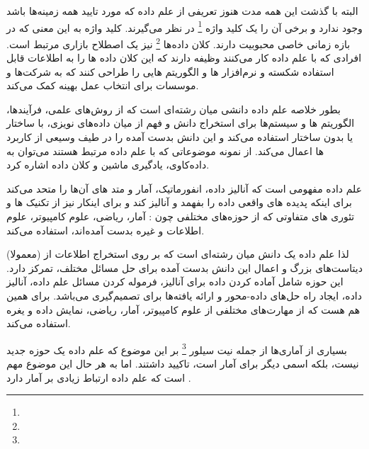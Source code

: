\documentclass[a4paper, 12pt]{article}
\begin{document}
البته با گذشت این همه مدت هنوز تعریفی از علم داده که مورد تایید همه زمینه‌ها باشد وجود ندارد و برخی آن‌ را یک کلید واژه
\footnote{}
 در نظر می‌گیرند. 
 کلید واژه به این معنی که در بازه زمانی خاصی محبوبیت دارند. 
 کلان داده‌ها 
 \footnote{}
 نیز یک اصطلاح بازاری مرتبط است. افرادی که با علم داده کار می‌کنند وظیفه دارند که این کلان داده ها را به اطلاعات قابل استفاده شکسته و نرم‌افزار ها و الگوریتم هایی را طراحی کنند که به شرکت‌ها و موسسات برای انتخاب عمل بهینه کمک می‌کند. 
 
 بطور خلاصه علم داده دانشی میان رشته‌ای است که از روش‌های علمی، فرآیند‌ها، الگوریتم ها و سیستم‌ها برای استخراج دانش و فهم از میان داده‌های نویزی، با ساختار یا بدون ساختار  استفاده می‌کند و این دانش بدست آمده را در طیف وسیعی از کاربرد ها اعمال می‌کند. از نمونه موضوعاتی که با علم داده مرتبط هستند می‌توان به داده‌کاوی، یادگیری ماشین و کلان داده اشاره کرد. 
 
 علم داده مفهومی است که آنالیز داده، انفورماتیک، آمار و متد های آن‌ها را متحد می‌کند برای اینکه پدیده های واقعی داده را بفهمد و آنالیز کند و برای اینکار نیز از تکنیک ها و تئوری های متفاوتی که از حوزه‌های مختلفی چون : آمار، ریاضی، علوم کامپیوتر، علوم اطلاعات و غیره بدست آمده‌اند، استفاده می‌کند. 
 
 لذا علم داده یک دانش میان رشته‌ای است که بر روی استخراج اطلاعات از (معمولا) دیتاست‌های بزرگ و اعمال این دانش بدست آمده برای حل مسائل مختلف، تمرکز دارد. این حوزه شامل آماده کردن داده برای آنالیز، فرموله کردن مسائل علم داده، آنالیز داده، ایجاد راه حل‌های داده-محور و ارائه یافته‌ها برای تصمیم‌گیری می‌باشد. برای همین هم هست که از مهارت‌های مختلفی از علوم کامپیوتر، آمار، ریاضی، نمایش داده و یغره استفاده می‌کند. 
 
 بسیاری از آماری‌ها از جمله نیت سیلور
 \footnote{}
 بر این موضوع که علم داده یک حوزه جدید نیست، بلکه اسمی دیگر برای آمار است، تاکیید داشتند. اما به هر حال این موضوع مهم است که علم داده ارتباط زیادی بر آمار دارد .
 
 
\end{document}
